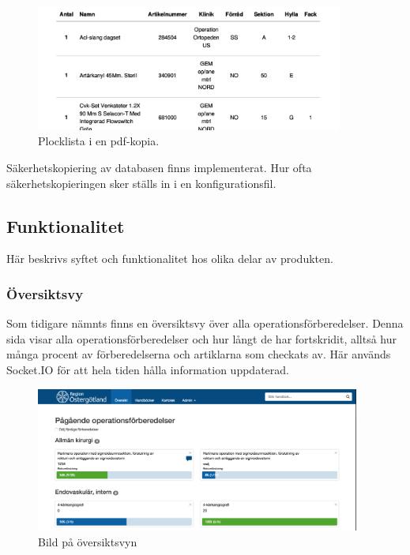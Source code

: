 \begin{figure}[H]
  \centering
  \includegraphics[width=0.9\textwidth]{images/pdf-end.png}
  \caption{Plocklista i en pdf-kopia.}
  \label{fig:pdf-end}
\end{figure}

Säkerhetskopiering av databasen finns implementerat. Hur ofta säkerhets\-kopieringen sker ställs in i en konfigurationsfil.

\subsection{Funktionalitet}
Här beskrivs syftet och funktionalitet hos olika delar av produkten.

\subsubsection{Översiktsvy}
Som tidigare nämnts finns en översiktsvy över alla operationsförberedelser.
Denna sida visar alla operationsförberedelser och hur långt de har fortskridit, alltså hur många procent av förberedelserna och artiklarna som checkats av.
Här används Socket.IO för att hela tiden hålla information uppdaterad.

\begin{figure}[H]
  \centering
  \includegraphics[width=0.95\textwidth]{images/site/overview.png}
  \caption{Bild på översiktsvyn}
  \label{fig:siteoverview}
\end{figure}

